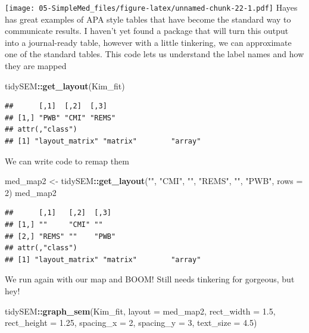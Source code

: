 \documentclass[
  11pt,
]{book}
\newenvironment{Shaded}{\begin{snugshade}}{\end{snugshade}}
\newcommand{\AttributeTok}[1]{\textcolor[rgb]{0.27,0.27,0.27}{#1}}
\newcommand{\DecValTok}[1]{\textcolor[rgb]{0.06,0.06,0.06}{#1}}
\newcommand{\FloatTok}[1]{\textcolor[rgb]{0.06,0.06,0.06}{#1}}
\newcommand{\FunctionTok}[1]{\textcolor[rgb]{0.27,0.27,0.27}{\textbf{#1}}}
\newcommand{\NormalTok}[1]{#1}
\newcommand{\OtherTok}[1]{\textcolor[rgb]{0.37,0.37,0.37}{#1}}
\newcommand{\SpecialCharTok}[1]{\textcolor[rgb]{0.43,0.43,0.43}{\textbf{#1}}}
\newcommand{\StringTok}[1]{\textcolor[rgb]{0.5,0.5,0.5}{#1}}
\begin{document}
\texttt{[image: 05-SimpleMed\_files/figure-latex/unnamed-chunk-22-1.pdf]} Hayes has great examples of APA style tables that have become the standard way to communicate results. I haven't yet found a package that will turn this output into a journal-ready table, however with a little tinkering, we can approximate one of the standard tables. This code lets us understand the label names and how they are mapped

\begin{Shaded}
\begin{Highlighting}[]
\NormalTok{tidySEM}\SpecialCharTok{::}\FunctionTok{get\_layout}\NormalTok{(Kim\_fit)}
\end{Highlighting}
\end{Shaded}

\begin{verbatim}
##      [,1]  [,2]  [,3]  
## [1,] "PWB" "CMI" "REMS"
## attr(,"class")
## [1] "layout_matrix" "matrix"        "array"
\end{verbatim}

We can write code to remap them

\begin{Shaded}
\begin{Highlighting}[]
\NormalTok{med\_map2 }\OtherTok{\textless{}{-}}\NormalTok{ tidySEM}\SpecialCharTok{::}\FunctionTok{get\_layout}\NormalTok{(}\StringTok{""}\NormalTok{, }\StringTok{"CMI"}\NormalTok{, }\StringTok{""}\NormalTok{, }\StringTok{"REMS"}\NormalTok{, }\StringTok{""}\NormalTok{, }\StringTok{"PWB"}\NormalTok{, }\AttributeTok{rows =} \DecValTok{2}\NormalTok{)}
\NormalTok{med\_map2}
\end{Highlighting}
\end{Shaded}

\begin{verbatim}
##      [,1]   [,2]  [,3] 
## [1,] ""     "CMI" ""   
## [2,] "REMS" ""    "PWB"
## attr(,"class")
## [1] "layout_matrix" "matrix"        "array"
\end{verbatim}

We run again with our map and BOOM! Still needs tinkering for gorgeous, but hey!

\begin{Shaded}
\begin{Highlighting}[]
\NormalTok{tidySEM}\SpecialCharTok{::}\FunctionTok{graph\_sem}\NormalTok{(Kim\_fit, }\AttributeTok{layout =}\NormalTok{ med\_map2, }\AttributeTok{rect\_width =} \FloatTok{1.5}\NormalTok{, }\AttributeTok{rect\_height =} \FloatTok{1.25}\NormalTok{,}
    \AttributeTok{spacing\_x =} \DecValTok{2}\NormalTok{, }\AttributeTok{spacing\_y =} \DecValTok{3}\NormalTok{, }\AttributeTok{text\_size =} \FloatTok{4.5}\NormalTok{)}
\end{Highlighting}
\end{Shaded}
\end{document}

